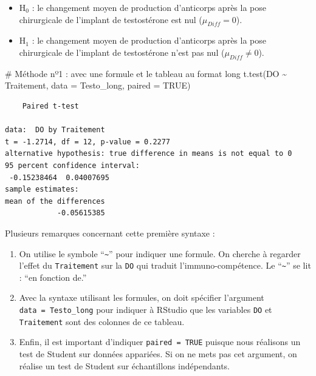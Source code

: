 \documentclass[
  a4paper,
]{article}
\newenvironment{Shaded}{\begin{snugshade}}{\end{snugshade}}
\newcommand{\AttributeTok}[1]{\textcolor[rgb]{0.00,0.34,0.68}{#1}}
\newcommand{\CommentTok}[1]{\textcolor[rgb]{0.54,0.53,0.53}{#1}}
\newcommand{\ConstantTok}[1]{\textcolor[rgb]{0.67,0.33,0.00}{#1}}
\newcommand{\FunctionTok}[1]{\textcolor[rgb]{0.39,0.29,0.61}{#1}}
\newcommand{\NormalTok}[1]{\textcolor[rgb]{0.12,0.11,0.11}{#1}}
\newcommand{\SpecialCharTok}[1]{\textcolor[rgb]{0.24,0.68,0.91}{#1}}
\providecommand{\tightlist}{%
  \setlength{\itemsep}{0pt}\setlength{\parskip}{0pt}}
\begin{document}
\begin{itemize}
\tightlist
\item
  H\(_0\) : le changement moyen de production d'anticorps après la pose chirurgicale de l'implant de testostérone est nul (\(\mu_{Diff} = 0\)).
\item
  H\(_1\) : le changement moyen de production d'anticorps après la pose chirurgicale de l'implant de testostérone n'est pas nul (\(\mu_{Diff} \neq 0\)).
\end{itemize}

\begin{Shaded}
\begin{Highlighting}[]
\CommentTok{\# Méthode nº1 : avec une formule et le tableau au format long}
\FunctionTok{t.test}\NormalTok{(DO }\SpecialCharTok{\textasciitilde{}}\NormalTok{ Traitement, }\AttributeTok{data =}\NormalTok{ Testo\_long, }\AttributeTok{paired =} \ConstantTok{TRUE}\NormalTok{)}
\end{Highlighting}
\end{Shaded}

\begin{verbatim}
    Paired t-test

data:  DO by Traitement
t = -1.2714, df = 12, p-value = 0.2277
alternative hypothesis: true difference in means is not equal to 0
95 percent confidence interval:
 -0.15238464  0.04007695
sample estimates:
mean of the differences 
            -0.05615385 
\end{verbatim}

Plusieurs remarques concernant cette première syntaxe :

\begin{enumerate}
\def\labelenumi{\arabic{enumi}.}
\tightlist
\item
  On utilise le symbole ``\texttt{\textasciitilde{}}'' pour indiquer une formule. On cherche à regarder l'effet du \texttt{Traitement} sur la \texttt{DO} qui traduit l'immuno-compétence. Le ``\texttt{\textasciitilde{}}'' se lit : ``en fonction de.''
\item
  Avec la syntaxe utilisant les formules, on doit spécifier l'argument \texttt{data\ =\ Testo\_long} pour indiquer à RStudio que les variables \texttt{DO} et \texttt{Traitement} sont des colonnes de ce tableau.
\item
  Enfin, il est important d'indiquer \texttt{paired\ =\ TRUE} puisque nous réalisons un test de Student sur données appariées. Si on ne mets pas cet argument, on réalise un test de Student sur échantillons indépendants.
\end{enumerate}
\end{document}
